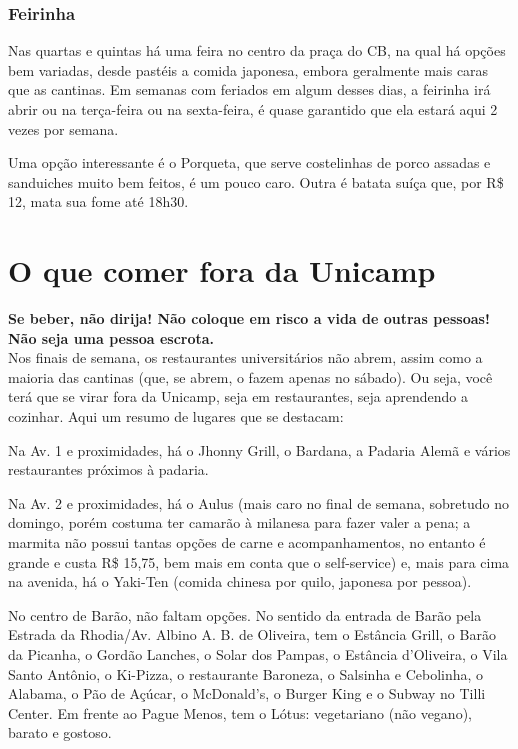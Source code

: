\subsubsection{Feirinha}

Nas quartas e quintas há uma feira no centro da praça do CB, na qual há opções
bem variadas, desde pastéis a comida japonesa, embora geralmente mais caras que
as cantinas. Em semanas com feriados em algum desses dias, a feirinha irá abrir
ou na terça-feira ou na sexta-feira, é quase garantido que ela estará aqui 2
vezes por semana.

Uma opção interessante é o Porqueta, que serve costelinhas de porco assadas e
sanduiches muito bem feitos, é um pouco caro. Outra é batata suíça que, por
R\$ 12, mata sua fome até 18h30.

\section{O que comer fora da Unicamp}

\textbf{Se beber, não dirija! Não coloque em risco a vida de outras pessoas! Não
seja uma pessoa escrota.}\\

Nos finais de semana, os restaurantes universitários não abrem, assim como a
maioria das cantinas (que, se abrem, o fazem apenas no sábado). Ou seja, você
terá que se virar fora da Unicamp, seja em restaurantes, seja aprendendo a
cozinhar. Aqui um resumo de lugares que se destacam:

Na Av. 1 e proximidades, há o Jhonny Grill, o Bardana, a Padaria Alemã e vários
restaurantes próximos à padaria.

Na Av. 2 e proximidades, há o Aulus (mais caro no final de semana, sobretudo no
domingo, porém costuma ter camarão à milanesa para fazer valer a pena; a
marmita não possui tantas opções de carne e acompanhamentos, no entanto é
grande e custa R\$ 15,75, bem mais em conta que o self-service) e, mais para
cima na avenida, há o Yaki-Ten (comida chinesa por quilo, japonesa por pessoa).

No centro de Barão, não faltam opções. No sentido da entrada de Barão pela
Estrada da Rhodia/Av. Albino A. B. de Oliveira, tem o Estância Grill, o Barão
da Picanha, o Gordão Lanches, o Solar dos Pampas, o Estância d'Oliveira, o Vila
Santo Antônio, o Ki-Pizza, o restaurante Baroneza, o Salsinha e Cebolinha, o
Alabama, o Pão de Açúcar, o McDonald's, o Burger King e o Subway no Tilli
Center. Em frente ao Pague Menos, tem o Lótus: vegetariano (não vegano), barato
e gostoso.

